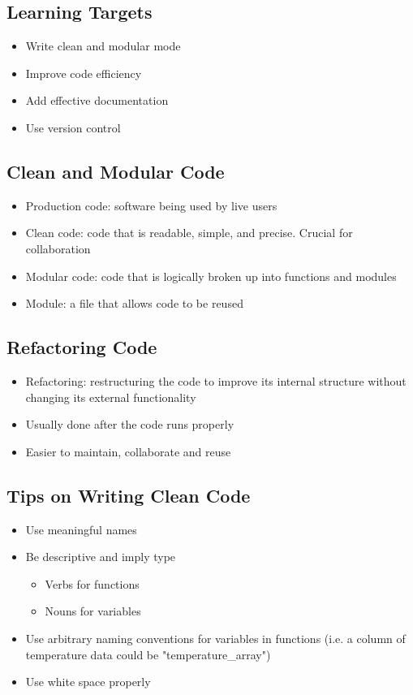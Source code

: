 
\subsection{Learning Targets}

\begin{itemize}
	\item Write clean and modular mode
	\item Improve code efficiency
	\item Add effective documentation
	\item Use version control
\end{itemize}

\subsection{Clean and Modular Code}
\begin{itemize}
	\item Production code: software being used by live users
	\item Clean code: code that is readable, simple, and precise. Crucial for collaboration
	\item Modular code: code that is logically broken up into functions and modules
	\item Module: a file that allows code to be reused
\end{itemize}

\subsection{Refactoring Code}
\begin{itemize}
	\item Refactoring: restructuring the code to improve its internal structure without changing its external functionality
	\item Usually done after the code runs properly
	\item Easier to maintain, collaborate and reuse
\end{itemize}

\subsection{Tips on Writing Clean Code}
\begin{itemize}
	\item Use meaningful names
	\item Be descriptive and imply type
	\begin{itemize}
		\item Verbs for functions
		\item Nouns for variables
	\end{itemize}
	\item Use arbitrary naming conventions for variables in functions (i.e. a column of temperature data could be "temperature\_array")
	\item Use white space properly
\end{itemize}

